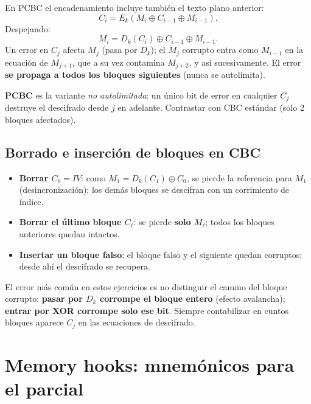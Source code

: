 \documentclass[11pt,a4paper]{article}
\begin{document}
En PCBC el encadenamiento incluye tambi\'en el texto plano anterior:
\[
  C_i = E_k(M_i \oplus C_{i-1} \oplus M_{i-1}).
\]
Despejando:
\[
  M_i = D_k(C_i) \oplus C_{i-1} \oplus M_{i-1}.
\]
Un error en $C_j$ afecta $M_j$ (pasa por $D_k$); el $M_j$ corrupto entra
como $M_{i-1}$ en la ecuaci\'on de $M_{j+1}$, que a su vez contamina
$M_{j+2}$, y as\'i sucesivamente. El error \textbf{se propaga a todos los
bloques siguientes} (nunca se autolimita).

\begin{ojo}
  \textbf{PCBC} es la variante \emph{no autolimitada}: un \'unico bit de
  error en cualquier $C_j$ destruye el descifrado desde $j$ en adelante.
  Contrastar con CBC est\'andar (solo 2 bloques afectados).
\end{ojo}

\subsection{Borrado e inserci\'on de bloques en CBC}

\begin{itemize}[nosep]
  \item \textbf{Borrar $C_0 = IV$}: como $M_1 = D_k(C_1)\oplus C_0$, se
    pierde la referencia para $M_1$ (desincronizaci\'on); los dem\'as bloques
    se descifran con un corrimiento de \'indice.
  \item \textbf{Borrar el \'ultimo bloque $C_\ell$}: se pierde \textbf{solo
    $M_\ell$}; todos los bloques anteriores quedan intactos.
  \item \textbf{Insertar un bloque falso}: el bloque falso y el siguiente
    quedan corruptos; desde ahí el descifrado se recupera.
\end{itemize}

\begin{ojo}
  El error m\'as com\'un en estos ejercicios es no distinguir el camino del
  bloque corrupto: \textbf{pasar por $D_k$ corrompe el bloque entero}
  (efecto avalancha); \textbf{entrar por XOR corrompe solo ese bit}.
  Siempre contabilizar en cuntos bloques aparece $C_j$ en las ecuaciones
  de descifrado.
\end{ojo}

\section{Memory hooks: mnem\'onicos para el parcial}
\end{document}
